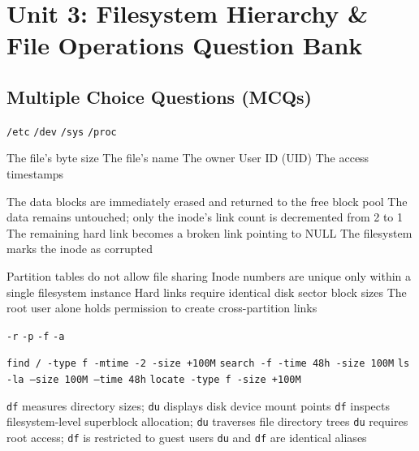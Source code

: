 \chapter{Unit 3: Filesystem Hierarchy \& File Operations Question Bank}

\section{Multiple Choice Questions (MCQs)}

{\texttt{/etc}}
{\texttt{/dev}}
{\texttt{/sys}}
{\texttt{/proc}}

{The file's byte size}
{The file's name}
{The owner User ID (UID)}
{The access timestamps}

{The data blocks are immediately erased and returned to the free block pool}
{The data remains untouched; only the inode's link count is decremented from 2 to 1}
{The remaining hard link becomes a broken link pointing to NULL}
{The filesystem marks the inode as corrupted}

{Partition tables do not allow file sharing}
{Inode numbers are unique only within a single filesystem instance}
{Hard links require identical disk sector block sizes}
{The root user alone holds permission to create cross-partition links}

{\texttt{-r}}
{\texttt{-p}}
{\texttt{-f}}
{\texttt{-a}}

{\texttt{find / -type f -mtime -2 -size +100M}}
{\texttt{search -f -time 48h -size 100M}}
{\texttt{ls -la --size 100M --time 48h}}
{\texttt{locate -type f -size +100M}}

{\texttt{df} measures directory sizes; \texttt{du} displays disk device mount points}
{\texttt{df} inspects filesystem-level superblock allocation; \texttt{du} traverses file directory trees}
{\texttt{du} requires root access; \texttt{df} is restricted to guest users}
{\texttt{du} and \texttt{df} are identical aliases}

